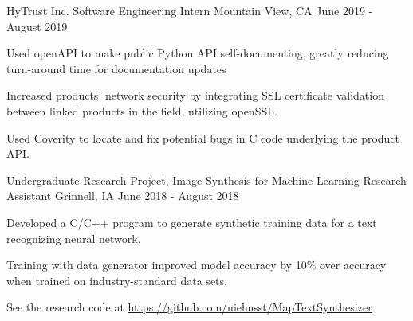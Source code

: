 \documentclass[12pt, a4paper]{awesome-cv}
\begin{document}
\begin{cventries}

  \cventry
    {HyTrust Inc.}
    {Software Engineering Intern}
    {Mountain View, CA}
    {June 2019 - August 2019}
    {
      \begin{cvitems}
      	\item {Used openAPI to make public Python API self-documenting, greatly reducing turn-around time for documentation updates}
	      \item {Increased products' network security by integrating SSL certificate validation between linked products in the field, utilizing openSSL.}
	      \item {Used Coverity to locate and fix potential bugs in C code underlying the product API.}
      \end{cvitems}
    }



  \cventry
    {Undergraduate Research Project, Image Synthesis for Machine Learning}
    {Research Assistant}
    {Grinnell, IA}
    {June 2018 - August 2018}
    {
      \begin{cvitems}
        \item{Developed a C/C++ program to generate synthetic training data for a text recognizing neural network.}
        \item{Training with data generator improved model accuracy by 10\% over accuracy when trained on industry-standard data sets.}
	      \item{See the research code at \underline{\href{https://github.com/niehusst/MapTextSynthesizer}{https://github.com/niehusst/MapTextSynthesizer}}}
      \end{cvitems}
    }



\end{cventries}
\end{document}
